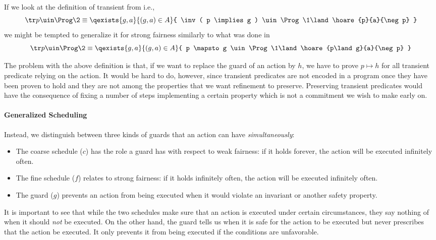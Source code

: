 If we look at the definition of transient from \cite{DBLP:journals/csur/Misra96} i.e., 
	\[ \tr p \uin \Prog  \2\equiv 
			\qexists{g,a}{(g,a) \in A}{ \inv ( p \implies g ) \uin \Prog 
				\1\land \hoare{p}{a}{\neg p} } \]
we might be tempted to generalize it for strong fairness similarly to what was done in \cite{DBLP:journals/fac/JutlaR97} 
	\[ \tr p \uin \Prog  \2\equiv 
			\qexists{g,a}{(g,a) \in A}{ p \mapsto g \uin \Prog
				\1\land \hoare{p\land g}{a}{\neg p} } \]

The problem with the above definition is that, if we want to replace the guard of an action by $h$, we have to prove $p \mapsto h$ for all transient predicate relying on the action.  It would be hard to do, however, since transient predicates are not encoded in a program once they have been proven to hold and they are not among the properties that we want refinement to preserve. Preserving transient predicates would have the consequence of fixing a number of steps implementing a certain property which is not a commitment we wish to make early on.

\paragraph{Generalized Scheduling}
Instead, we distinguish between three kinds of guards that an action can have \emph{simultaneously}:
\begin{itemize}
\item The coarse schedule ($c$) has the role a guard has with respect to weak fairness: if it holds forever, the action will be executed infinitely often.  

\item The fine schedule ($f$) relates to strong fairness: if it holds infinitely often, the action will be executed infinitely often. 

\item The guard ($g$) prevents an action from being executed when it would violate an invariant or another safety property.  
\end{itemize}
It is important to see that while the two schedules make sure that an action is executed under certain circumstances, they say nothing of when it should \emph{not} be executed. On the other hand, the guard tells us when it is safe for the action to be executed but never prescribes that the action be executed. It only prevents it from being executed if the conditions are unfavorable.

